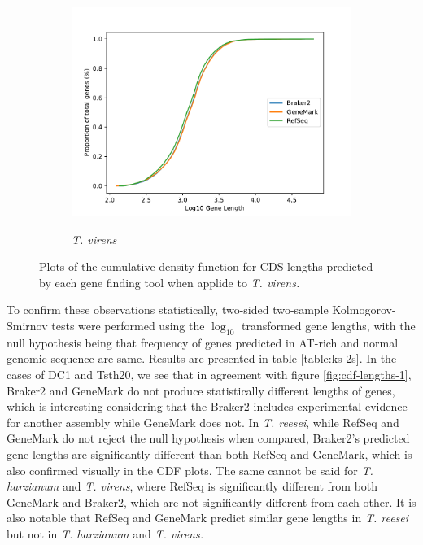 \begin{figure}
  \centering
  \begin{subfigure}{0.7\textwidth}
    \includegraphics[width=\textwidth]{figures/t-virens-cdf-lengths-log.pdf}
    \label{fig:tvirens-lengths}
    \caption{\textit{T. virens}}
  \end{subfigure}
  \caption[CDF plots part 3.]{Plots of the
    cumulative density function for CDS lengths predicted by each gene
    finding tool when applide to \textit{T. virens.}}
  \label{fig:cdf-lengths-3}
\end{figure}

To confirm these observations statistically, two-sided two-sample
Kolmogorov-Smirnov tests were performed using the $\log_{10}$
transformed gene lengths, with the null hypothesis being that
frequency of genes predicted in AT-rich and normal genomic sequence
are same. Results are presented in table \ref{table:ks-2s}. In the
cases of DC1 and Tsth20, we see that in agreement with figure
\ref{fig:cdf-lengths-1}, Braker2 and GeneMark do not produce
statistically different lengths of genes, which is interesting
considering that the Braker2 includes experimental evidence for
another assembly while GeneMark does not. In \textit{T. reesei}, while
RefSeq and GeneMark do not reject the null hypothesis when compared,
Braker2's predicted gene lengths are significantly different than both
RefSeq and GeneMark, which is also confirmed visually in the CDF
plots. The same cannot be said for \textit{T. harzianum} and
\textit{T. virens}, where RefSeq is significantly different from both
GeneMark and Braker2, which are not significantly different from each
other. It is also notable that RefSeq and GeneMark predict similar
gene lengths in \textit{T. reesei} but not in \textit{T. harzianum}
and \textit{T. virens.}

